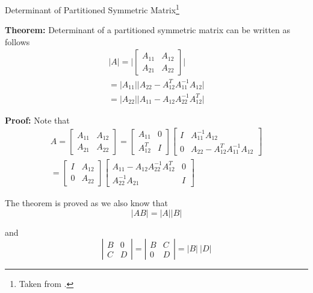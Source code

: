 \documentclass{beamer}
\begin{document}
\begin{frame}{Determinant of Partitioned Symmetric Matrix\footnote{Taken from \nodeSix.}}
	
\textbf{Theorem:} Determinant of a partitioned symmetric matrix can be written as follows
	\begin{gather}
		\vert A \vert 
		= \bigg| 
		\begin{bmatrix}
			A_{11}&A_{12}\\
			A_{21}&A_{22}
		\end{bmatrix}
		\bigg| \\
		=\vert A_{11}\vert \vert A_{22}-A_{12}^TA_{11}^{-1}A_{12}\vert \\
		=\vert A_{22}\vert \vert
		 A_{11}-A_{12}A_{22}^{-1}A_{12}^T \vert 
	\end{gather}
	
\end{frame}

\begin{frame}	
\textbf{Proof:} Note that
	\begin{gather}
		A = 
		\begin{bmatrix}
			A_{11}&A_{12} \\
			A_{21}&A_{22}
		\end{bmatrix}
		= 
		\begin{bmatrix}
			A_{11}& 0 \\
			A_{12}^T& I
		\end{bmatrix}
		\begin{bmatrix}
			I & A_{11}^{-1}A_{12} \\
			0 & A_{22} - A_{12}^TA_{11}^{-1}A_{12}
		\end{bmatrix}\\
		= 
		\begin{bmatrix}
			I & A_{12} \\
			0 & A_{22}
		\end{bmatrix}
		\begin{bmatrix}
			A_{11} - A_{12}A_{22}^{-1}A_{12}^T & 0\\
			A_{22}^{-1}A_{21}  & I
		\end{bmatrix}
	\end{gather} 
	
The theorem is proved as we also know that
\begin{equation}
	\vert AB\vert=\vert A\vert  \vert B\vert 
\end{equation}

and
\begin{equation}
	\left\vert 
		\begin{matrix}
			B&0 \\
			C&D
		\end{matrix} 
	\right\vert
	=
	\left\vert 
		\begin{matrix}
			B&C \\
			0&D
		\end{matrix} 
	\right\vert
	=
	\vert B\vert\
	\vert D\vert 
\end{equation}	
\end{frame}
\end{document}
